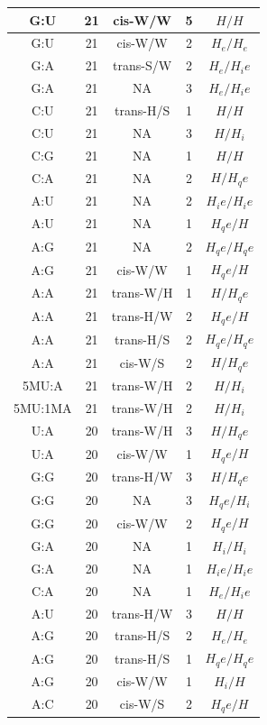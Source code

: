 \begin{center}
\begin{longtable}{c|c|c|c|c}
G:U & 21 & cis-W/W & 5 & $H/H$ \\  \hline
G:U & 21 & cis-W/W & 2 & $H_e/H_e$ \\  \hline
G:A & 21 & trans-S/W & 2 & $H_e/H_ie$ \\  \hline
G:A & 21 & NA & 3 & $H_e/H_ie$ \\  \hline
C:U & 21 & trans-H/S & 1 & $H/H$ \\  \hline
C:U & 21 & NA & 3 & $H/H_i$ \\  \hline
C:G & 21 & NA & 1 & $H/H$ \\  \hline
C:A & 21 & NA & 2 & $H/H_qe$ \\  \hline
A:U & 21 & NA & 2 & $H_ie/H_ie$ \\  \hline
A:U & 21 & NA & 1 & $H_qe/H$ \\  \hline
A:G & 21 & NA & 2 & $H_qe/H_qe$ \\  \hline
A:G & 21 & cis-W/W & 1 & $H_qe/H$ \\  \hline
A:A & 21 & trans-W/H & 1 & $H/H_qe$ \\  \hline
A:A & 21 & trans-H/W & 2 & $H_qe/H$ \\  \hline
A:A & 21 & trans-H/S & 2 & $H_qe/H_qe$ \\  \hline
A:A & 21 & cis-W/S & 2 & $H/H_qe$ \\  \hline
5MU:A & 21 & trans-W/H & 2 & $H/H_i$ \\  \hline
5MU:1MA & 21 & trans-W/H & 2 & $H/H_i$ \\  \hline
U:A & 20 & trans-W/H & 3 & $H/H_qe$ \\  \hline
U:A & 20 & cis-W/W & 1 & $H_qe/H$ \\  \hline
G:G & 20 & trans-H/W & 3 & $H/H_qe$ \\  \hline
G:G & 20 & NA & 3 & $H_qe/H_i$ \\  \hline
G:G & 20 & cis-W/W & 2 & $H_qe/H$ \\  \hline
G:A & 20 & NA & 1 & $H_i/H_i$ \\  \hline
G:A & 20 & NA & 1 & $H_ie/H_ie$ \\  \hline
C:A & 20 & NA & 1 & $H_e/H_ie$ \\  \hline
A:U & 20 & trans-H/W & 3 & $H/H$ \\  \hline
A:G & 20 & trans-H/S & 2 & $H_e/H_e$ \\  \hline
A:G & 20 & trans-H/S & 1 & $H_qe/H_qe$ \\  \hline
A:G & 20 & cis-W/W & 1 & $H_i/H$ \\  \hline
A:C & 20 & cis-W/S & 2 & $H_qe/H$ \\  \hline

\end{longtable}
\end{center}
